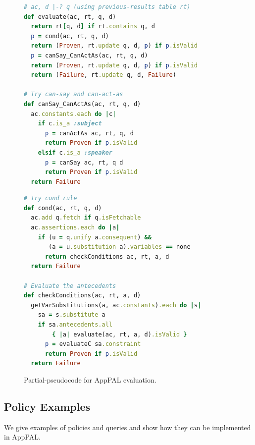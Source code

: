 \documentclass[]{scrartcl}
\begin{document}
\begin{figure}
\begin{minipage}[b]{0.5\linewidth}
\begin{lstlisting}[language=Ruby, basicstyle=\ttfamily\scriptsize, keywordstyle=\scriptsize\slshape, columns=flexible]
# ac, d |-? q (using previous-results table rt)
def evaluate(ac, rt, q, d)
  return rt[q, d] if rt.contains q, d
  p = cond(ac, rt, q, d)
  return (Proven, rt.update q, d, p) if p.isValid
  p = canSay_CanActAs(ac, rt, q, d)
  return (Proven, rt.update q, d, p) if p.isValid
  return (Failure, rt.update q, d, Failure)

# Try can-say and can-act-as
def canSay_CanActAs(ac, rt, q, d)
  ac.constants.each do |c|
    if c.is_a :subject
      p = canActAs ac, rt, q, d
      return Proven if p.isValid
    elsif c.is_a :speaker
      p = canSay ac, rt, q d
      return Proven if p.isValid
  return Failure
\end{lstlisting}
\end{minipage}
\begin{minipage}[b]{0.5\linewidth}
\begin{lstlisting}[language=Ruby, basicstyle=\ttfamily\scriptsize, keywordstyle=\scriptsize\slshape, columns=flexible]
# Try cond rule
def cond(ac, rt, q, d)
  ac.add q.fetch if q.isFetchable
  ac.assertions.each do |a|
    if (u = q.unify a.consequent) &&
       (a = u.substitution a).variables == none
      return checkConditions ac, rt, a, d
  return Failure

# Evaluate the antecedents
def checkConditions(ac, rt, a, d)
  getVarSubstitutions(a, ac.constants).each do |s|
    sa = s.substitute a
    if sa.antecedents.all
        { |a| evaluate(ac, rt, a, d).isValid }
      p = evaluateC sa.constraint
      return Proven if p.isValid
  return Failure
\end{lstlisting}
\end{minipage}
\caption{Partial-pseudocode for AppPAL evaluation.}
\label{fig:pseudocode}
\end{figure}

\subsection{Policy Examples}
\label{ssec:idioms}

We give examples of policies and queries and show how they can be implemented in AppPAL.
\end{document}
